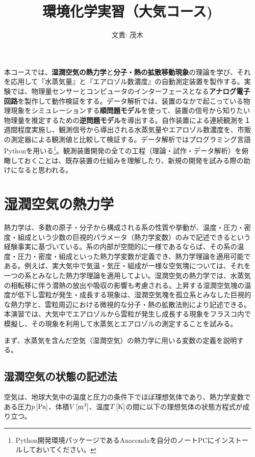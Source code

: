 \documentclass{jsarticle}
\begin{document}
\title{環境化学実習（大気コース)}

\author{文責: 茂木}

\maketitle
本コースでは、{\bf 湿潤空気の熱力学}と{\bf 分子・熱の拡散移動現象}の理論を学び、それを応用して『水蒸気量』と『エアロゾル数濃度』の自動測定装置を製作する。実験では、物理量センサーとコンピュータのインターフェースとなる{\bf アナログ電子回路}を製作して動作検証をする。データ解析では、装置のなかで起こっている物理現象をシミュレーションする{\bf 順問題モデル}を使って、装置の信号から知りたい物理量を推定するための{\bf 逆問題モデル}を導出する。自作装置による連続観測を１週間程度実施し、観測信号から導出される水蒸気量やエアロゾル数濃度を、市販の測定器による観測値と比較して検証する。データ解析ではプログラミング言語Pythonを用いる\footnote{Python開発環境パッケージであるAnacondaを自分のノートPCにインストールしておいてください。}。観測装置開発の全ての工程（理論・試作・データ解析）を俯瞰しておくことは、既存装置の仕組みを理解したり、新規の開発を試みる際の助けになると思われる。

\tableofcontents


\section{湿潤空気の熱力学}
熱力学は、多数の原子・分子から構成される系の性質や挙動が、温度・圧力・密度・組成という少数の巨視的パラメータ（熱力学変数）のみで記述できるという経験事実に基づいている。系の内部が空間的に一様であるならば、その系の温度・圧力・密度・組成といった熱力学変数が定義でき、熱力学理論を適用可能である。例えば、実大気中で気温・気圧・組成が一様な空気塊については、それを一つの系とみなした熱力学理論を適用してよい。湿潤空気の熱力学では、水蒸気の相転移に伴う潜熱の放出や吸収の影響も考慮される。上昇する湿潤空気塊の温度が低下し雲粒が発生・成長する現象は、湿潤空気塊を孤立系とみなした巨視的な熱力学と、雲粒周辺における微視的な分子・熱の拡散法則により記述できる。本演習では、大気中でエアロゾルから雲粒が発生し成長する現象をフラスコ内で模擬し、その現象を利用して水蒸気とエアロゾルの測定することを試みる。

まず、水蒸気を含んだ空気（湿潤空気）の熱力学に用いる変数の定義を説明する。

\subsection{湿潤空気の状態の記述法}
空気は、地球大気中の温度と圧力の条件下でほぼ理想気体であり、熱力学変数である圧力$p\,[\rm{Pa}]$、体積$V\,[\rm{m^{3}}]$、温度$T\,[\rm{K}]$の間に以下の理想気体の状態方程式が成り立つ。
\end{document}

